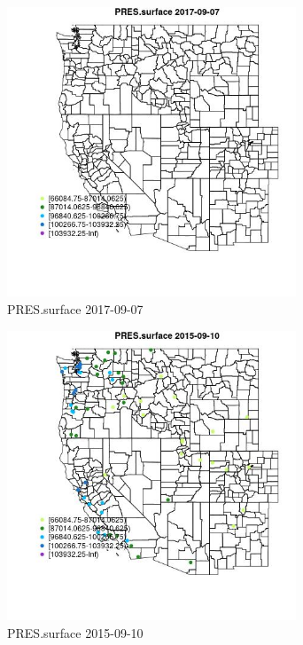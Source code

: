 \begin{figure} 
\centering  
\includegraphics[width=0.77\textwidth]{Code_Outputs/Report_ML_input_PM25_Step4_part_e_de_duplicated_aveswNAs_MapObsPRESsurface2017-09-07.jpg} 
\caption{\label{fig:Report_ML_input_PM25_Step4_part_e_de_duplicated_aveswNAsMapObsPRESsurface2017-09-07}PRES.surface 2017-09-07} 
\end{figure} 
 

\clearpage 

\begin{figure} 
\centering  
\includegraphics[width=0.77\textwidth]{Code_Outputs/Report_ML_input_PM25_Step4_part_e_de_duplicated_aveswNAs_MapObsPRESsurface2015-09-10.jpg} 
\caption{\label{fig:Report_ML_input_PM25_Step4_part_e_de_duplicated_aveswNAsMapObsPRESsurface2015-09-10}PRES.surface 2015-09-10} 
\end{figure} 
 

